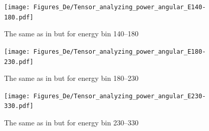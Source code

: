         

    \begin{figure}[h]
        \begin{center}
        \texttt{[image: Figures\_De/Tensor\_analyzing\_power\_angular\_E140-180.pdf]}
        \end{center}
        \caption{The same as in  but for energy bin \SIrange{140}{180}{\mev}}
        \label{tensor_angular_140-180}
    \end{figure}
        

    \begin{figure}[h]
        \begin{center}
        \texttt{[image: Figures\_De/Tensor\_analyzing\_power\_angular\_E180-230.pdf]}
        \end{center}
        \caption{The same as in  but for energy bin \SIrange{180}{230}{\mev}}
        \label{tensor_angular_180-230}
    \end{figure}

    \begin{figure}[h]
        \begin{center}
        \texttt{[image: Figures\_De/Tensor\_analyzing\_power\_angular\_E230-330.pdf]}
        \end{center}
        \caption{The same as in  but for energy bin \SIrange{230}{330}{\mev}}
        \label{tensor_angular_230-330}
    \end{figure}
        


